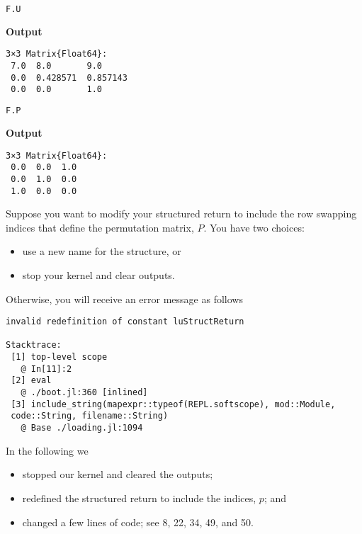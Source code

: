 \begin{lstlisting}[language=Julia,style=mystyle]
F.U
\end{lstlisting}
\textbf{Output} 
\begin{verbatim}
3×3 Matrix{Float64}:
 7.0  8.0       9.0
 0.0  0.428571  0.857143
 0.0  0.0       1.0
\end{verbatim}

\begin{lstlisting}[language=Julia,style=mystyle]
F.P
\end{lstlisting}
\textbf{Output} 
\begin{verbatim}
3×3 Matrix{Float64}:
 0.0  0.0  1.0
 0.0  1.0  0.0
 1.0  0.0  0.0
\end{verbatim}

\begin{tcolorbox}[
title=\textcolor{red}{\Large \bf Heads Up!}]
Suppose you want to modify your structured return to include the row swapping indices that define the permutation matrix, $P$. You have two choices:
\begin{itemize}
    \item use a new name for the structure, or
    \item stop your kernel and clear outputs. 
\end{itemize}
Otherwise, you will receive an error message as follows
\begin{verbatim}
invalid redefinition of constant luStructReturn

Stacktrace:
 [1] top-level scope
   @ In[11]:2
 [2] eval
   @ ./boot.jl:360 [inlined]
 [3] include_string(mapexpr::typeof(REPL.softscope), mod::Module,
 code::String, filename::String)
   @ Base ./loading.jl:1094
\end{verbatim}
\end{tcolorbox}

In the following we
\begin{itemize}
\item stopped our kernel and cleared the outputs;
    \item redefined the structured return to include the indices, $p$; and
    \item changed a few lines of code; see 8, 22, 34, 49, and 50.
\end{itemize}

